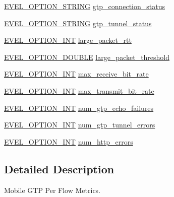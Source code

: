 \begin{DoxyCompactItemize}
\item 
\hyperlink{evel_8h_a0de5113a7b72de93c0c7b644f7ea7ec3}{E\+V\+E\+L\+\_\+\+O\+P\+T\+I\+O\+N\+\_\+\+S\+T\+R\+I\+NG} \hyperlink{structmobile__gtp__per__flow__metrics_a89fdf6278e4c7838d40f523a82b7ca23}{gtp\+\_\+connection\+\_\+status}
\item 
\hyperlink{evel_8h_a0de5113a7b72de93c0c7b644f7ea7ec3}{E\+V\+E\+L\+\_\+\+O\+P\+T\+I\+O\+N\+\_\+\+S\+T\+R\+I\+NG} \hyperlink{structmobile__gtp__per__flow__metrics_ac056f28d4a00c59e101c51225aaecb64}{gtp\+\_\+tunnel\+\_\+status}
\item 
\hyperlink{evel_8h_a452d825778d1c2368a54b8f689a25ba7}{E\+V\+E\+L\+\_\+\+O\+P\+T\+I\+O\+N\+\_\+\+I\+NT} \hyperlink{structmobile__gtp__per__flow__metrics_a01a860c4af596cc941b0ce9ac1464f37}{large\+\_\+packet\+\_\+rtt}
\item 
\hyperlink{evel_8h_aafc42b3cd9aca88804c3d413e4ccec06}{E\+V\+E\+L\+\_\+\+O\+P\+T\+I\+O\+N\+\_\+\+D\+O\+U\+B\+LE} \hyperlink{structmobile__gtp__per__flow__metrics_a1e3e6f6b328aad19fdab33e1cc179b1a}{large\+\_\+packet\+\_\+threshold}
\item 
\hyperlink{evel_8h_a452d825778d1c2368a54b8f689a25ba7}{E\+V\+E\+L\+\_\+\+O\+P\+T\+I\+O\+N\+\_\+\+I\+NT} \hyperlink{structmobile__gtp__per__flow__metrics_a512b5e3eced30bb9db9f38e8cc83b5f4}{max\+\_\+receive\+\_\+bit\+\_\+rate}
\item 
\hyperlink{evel_8h_a452d825778d1c2368a54b8f689a25ba7}{E\+V\+E\+L\+\_\+\+O\+P\+T\+I\+O\+N\+\_\+\+I\+NT} \hyperlink{structmobile__gtp__per__flow__metrics_af9edf92628a5ad61ce7368a81f241d54}{max\+\_\+transmit\+\_\+bit\+\_\+rate}
\item 
\hyperlink{evel_8h_a452d825778d1c2368a54b8f689a25ba7}{E\+V\+E\+L\+\_\+\+O\+P\+T\+I\+O\+N\+\_\+\+I\+NT} \hyperlink{structmobile__gtp__per__flow__metrics_a5996ce5c1dd8fe7f5c595d648ece877e}{num\+\_\+gtp\+\_\+echo\+\_\+failures}
\item 
\hyperlink{evel_8h_a452d825778d1c2368a54b8f689a25ba7}{E\+V\+E\+L\+\_\+\+O\+P\+T\+I\+O\+N\+\_\+\+I\+NT} \hyperlink{structmobile__gtp__per__flow__metrics_ab233758fc0f8f3f1c33ac6d2dcbf5709}{num\+\_\+gtp\+\_\+tunnel\+\_\+errors}
\item 
\hyperlink{evel_8h_a452d825778d1c2368a54b8f689a25ba7}{E\+V\+E\+L\+\_\+\+O\+P\+T\+I\+O\+N\+\_\+\+I\+NT} \hyperlink{structmobile__gtp__per__flow__metrics_ac63c00b6735ed1f1b83c5827c1023713}{num\+\_\+http\+\_\+errors}
\end{DoxyCompactItemize}


\subsection{Detailed Description}
Mobile G\+TP Per Flow Metrics. 

